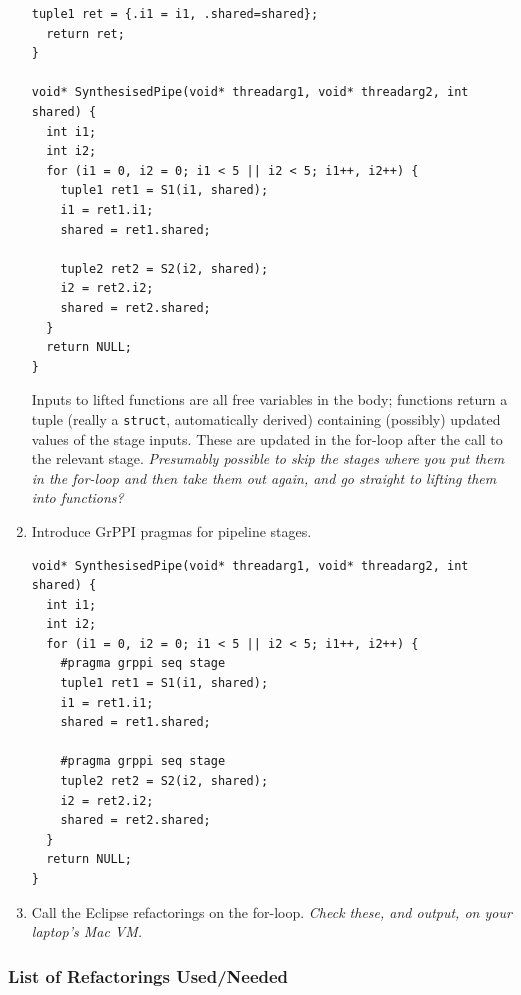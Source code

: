 \documentclass{llncs}
\begin{document}
\begin{enumerate}
\begin{lstlisting}[frame=single]
  tuple1 ret = {.i1 = i1, .shared=shared};
  return ret;
}

void* SynthesisedPipe(void* threadarg1, void* threadarg2, int shared) {
  int i1;
  int i2;
  for (i1 = 0, i2 = 0; i1 < 5 || i2 < 5; i1++, i2++) {
    tuple1 ret1 = S1(i1, shared);
    i1 = ret1.i1;
    shared = ret1.shared;
   
    tuple2 ret2 = S2(i2, shared);
    i2 = ret2.i2;
    shared = ret2.shared;
  }
  return NULL;
}
\end{lstlisting}
Inputs to lifted functions are all free variables in the body; functions return a tuple (really a \lstinline|struct|, automatically derived) containing (possibly) updated values of the stage inputs. These are updated in the for-loop after the call to the relevant stage. \emph{Presumably possible to skip the stages where you put them in the for-loop and then take  them out again, and go straight to lifting them into functions?}

\item Introduce GrPPI pragmas for pipeline stages.
\begin{lstlisting}[frame=single]
void* SynthesisedPipe(void* threadarg1, void* threadarg2, int shared) {
  int i1;
  int i2;
  for (i1 = 0, i2 = 0; i1 < 5 || i2 < 5; i1++, i2++) {
    #pragma grppi seq stage
    tuple1 ret1 = S1(i1, shared);
    i1 = ret1.i1;
    shared = ret1.shared;
   
    #pragma grppi seq stage
    tuple2 ret2 = S2(i2, shared);
    i2 = ret2.i2;
    shared = ret2.shared;
  }
  return NULL;
}
\end{lstlisting}

\item Call the Eclipse refactorings on the for-loop. \emph{Check these, and output, on your laptop's Mac VM.}
\end{enumerate}

\subsubsection{List of Refactorings Used/Needed}
\end{document}
